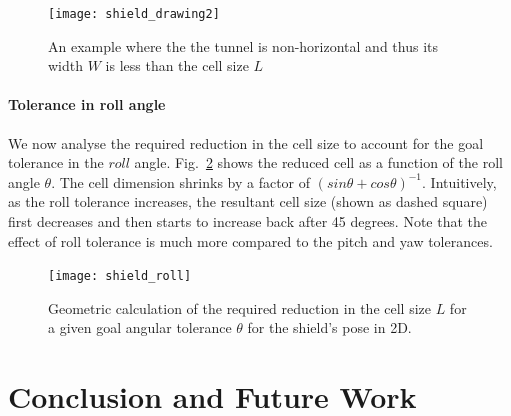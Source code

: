 \documentclass[a4paper]{report}
\begin{document}
\begin{figure}[bt]
\centering
\texttt{[image: shield\_drawing2]}
\caption{An example where the the tunnel is non-horizontal and thus its width $W$ is less than the cell size $L$}
\label{fig:shield2}
\end{figure}

\subsubsection{Tolerance in roll angle}
We now analyse the required reduction in the cell size to account for the goal tolerance in the $roll$ angle. Fig.~\ref{fig:shield3} shows the reduced cell as a function of the roll angle $\theta$. The cell dimension shrinks by a factor of $(sin \theta + cos \theta)^{-1}$. Intuitively, as the roll tolerance increases, the resultant cell size (shown as dashed square) first decreases and then starts to increase back after 45 degrees. Note that the effect of roll tolerance is much more compared to the pitch and yaw tolerances.

\begin{figure}[bt]
\centering
\texttt{[image: shield\_roll]}
\caption{Geometric calculation of the required reduction in the cell size $L$ for a given goal angular tolerance $\theta$ for the shield's pose in 2D.}
\label{fig:shield3}
\end{figure}

\newpage

\chapter{Conclusion and Future Work}

\newpage



\end{document}
